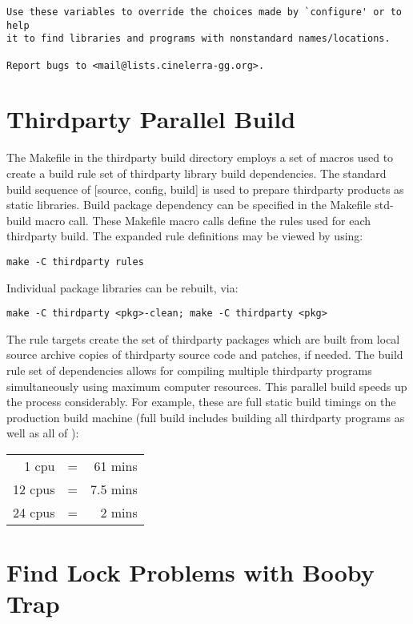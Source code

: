 \begin{verbatim}
Use these variables to override the choices made by `configure' or to help
it to find libraries and programs with nonstandard names/locations.

Report bugs to <mail@lists.cinelerra-gg.org>.

\end{verbatim}
\endgroup

\section{Thirdparty Parallel Build}
\label{sec:thirdparty_parallel_build}

The Makefile in the thirdparty build directory employs a set of macros used to create a build rule set of thirdparty library build dependencies.  The standard build sequence of [source, config, build] is used to prepare thirdparty products as static libraries.  Build package dependency can be specified in the Makefile std-build macro call.  These Makefile macro calls define the rules used for each thirdparty build.  The expanded rule definitions may be viewed by using:

\hspace{2em}\texttt{make -C thirdparty rules}

Individual package libraries can be rebuilt, via:

\hspace{2em}\texttt{make -C thirdparty <pkg>-clean;  make -C thirdparty <pkg>}

The rule targets create the set of thirdparty packages which are built from local source archive copies of thirdparty source code and patches, if needed.  The build rule set of dependencies allows for compiling multiple thirdparty programs simultaneously using maximum computer resources.  This parallel build speeds up the process considerably.  For example, these are full static build timings on the production build machine (full build includes building all thirdparty programs as well as all of \CGG{}):

\hspace{2em}
\begin{tabular}{@{}rcr}
	1 cpu & = & 61 mins\\
	12 cpus & = & 7.5 mins\\
	24 cpus & = & 2 mins\\
\end{tabular}

\section{Find Lock Problems with Booby Trap}
\label{sec:find_lock_problems_booby_trap}

